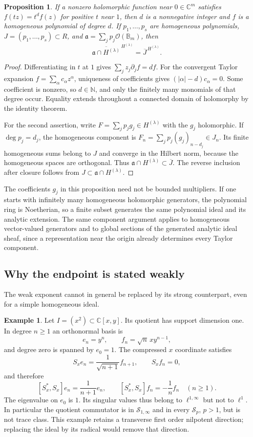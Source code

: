 \documentclass[11pt,reqno]{amsart}
\numberwithin{equation}{section}
\newtheorem{proposition}[theorem]{Proposition}
\theoremstyle{definition}
\newtheorem{example}[theorem]{Example}
\theoremstyle{remark}
\newcommand{\C}{\mathbb C}
\newcommand{\N}{\mathbb N}
\newcommand{\cO}{\mathcal O}
\newcommand{\cS}{\mathcal S}
\begin{document}
\begin{proposition}\label{ext:holomorphic}
If a nonzero holomorphic function near $0\in\C^m$ satisfies
$f(tz)=t^df(z)$ for positive $t$ near $1$, then $d$ is a nonnegative
integer and $f$ is a homogeneous polynomial of degree $d$.
If $p_1,\ldots,p_s$ are homogeneous polynomials,
$J=(p_1,\ldots,p_s)\subset R$, and
$\mathfrak a=\sum_jp_j\cO(\mathbb B_m)$, then
\[
 \overline{\mathfrak a\cap H^{(\lambda)}}^{\,H^{(\lambda)}}
   =\overline J^{\,H^{(\lambda)}}.
\]
\end{proposition}
\begin{proof}
Differentiating in $t$ at $1$ gives
$\sum_jz_j\partial_jf=df$.  For the convergent Taylor expansion
$f=\sum_\alpha c_\alpha z^\alpha$, uniqueness of coefficients gives
$(|\alpha|-d)c_\alpha=0$.  Some coefficient is nonzero, so
$d\in\N$, and only the finitely many monomials of that degree occur.
Equality extends throughout a connected domain of holomorphy by
the identity theorem.

For the second assertion, write $F=\sum_jp_jg_j\in H^{(\lambda)}$
with the $g_j$ holomorphic.  If $\deg p_j=d_j$, the homogeneous
component is $F_n=\sum_jp_j(g_j)_{n-d_j}\in J_n$.  Its finite
homogeneous sums belong to $J$ and converge in the Hilbert norm,
because the homogeneous spaces are orthogonal.  Thus
$\mathfrak a\cap H^{(\lambda)}\subset\overline J$.
The reverse inclusion after closure follows from
$J\subset\mathfrak a\cap H^{(\lambda)}$.
\end{proof}

The coefficients $g_j$ in this proposition need not be bounded
multipliers.  If one starts with infinitely many homogeneous
holomorphic generators, the polynomial ring is Noetherian, so a
finite subset generates the same polynomial ideal and its analytic
extension.  The same component argument applies to homogeneous
vector-valued generators and to global sections of the generated
analytic ideal sheaf, since a representation near the origin already
determines every Taylor component.

\subsection{Why the endpoint is stated weakly}
The weak exponent cannot in general be replaced by its strong
counterpart, even for a simple homogeneous ideal.

\begin{example}\label{ext:sharp}
Let $I=(x^2)\subset\C[x,y]$.  Its quotient has support dimension one.
In degree $n\ge1$ an orthonormal basis is
\[
 e_n=y^n,\qquad f_n=\sqrt n\,xy^{n-1},
\]
and degree zero is spanned by $e_0=1$.  The compressed $x$ coordinate
satisfies
\[
 S_xe_n=\frac1{\sqrt{n+1}}f_{n+1},\qquad S_xf_n=0,
\]
and therefore
\[
 [S_x^*,S_x]e_n=\frac1{n+1}e_n,
 \qquad [S_x^*,S_x]f_n=-\frac1n f_n\quad(n\ge1).
\]
The eigenvalue on $e_0$ is $1$.  Its singular values thus belong to
$\ell^{1,\infty}$ but not to $\ell^1$.  In particular the quotient
commutator is in $\cS_{1,\infty}$ and in every $\cS_p$, $p>1$,
but is not trace class.  This example retains a transverse first
order nilpotent direction; replacing the ideal by its radical would
remove that direction.
\end{example}
\end{document}
